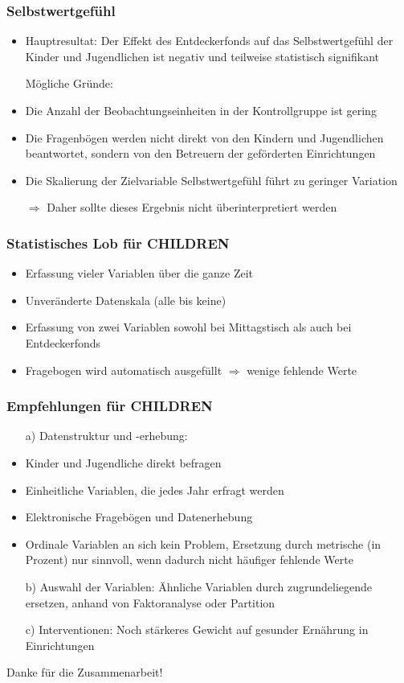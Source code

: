 \begin{frame}[fragile]
\frametitle{Selbstwertgefühl}
\begin{itemize}
\item Hauptresultat: Der Effekt des Entdeckerfonds auf das Selbstwertgefühl der Kinder und Jugendlichen ist negativ und teilweise statistisch signifikant
\linebreak
\item [ ] Mögliche Gründe:
\item Die Anzahl der Beobachtungseinheiten in der Kontrollgruppe ist gering
\item Die Fragenbögen werden nicht direkt von den Kindern und Jugendlichen beantwortet, sondern von den Betreuern der geförderten Einrichtungen
\item Die Skalierung der Zielvariable \glqq Selbstwertgefühl\grqq{} führt zu geringer Variation
\item [$\Rightarrow$] Daher sollte dieses Ergebnis nicht überinterpretiert werden
\end{itemize}
\end{frame}

\begin{frame}
\frametitle{Statistisches Lob für CHILDREN}
\begin{itemize}
\item<1-> Erfassung vieler Variablen über die ganze Zeit
\item<2-> Unveränderte Datenskala (alle bis keine)
\item<3-> Erfassung von zwei Variablen sowohl bei Mittagstisch als auch bei Entdeckerfonds
\item<4-> Fragebogen wird automatisch ausgefüllt $\Rightarrow$ wenige fehlende Werte
\end{itemize}
\end{frame}

\begin{frame}[fragile]
\frametitle{Empfehlungen für CHILDREN}
\begin{itemize}
\item[a)] Datenstruktur und -erhebung:
\item Kinder und Jugendliche direkt befragen
\item Einheitliche Variablen, die jedes Jahr erfragt werden
\item Elektronische Fragebögen und Datenerhebung
\item Ordinale Variablen an sich kein Problem, Ersetzung durch metrische (in Prozent) nur sinnvoll, wenn dadurch nicht häufiger fehlende Werte
\item[b)] Auswahl der Variablen: Ähnliche Variablen durch zugrundeliegende ersetzen, anhand von Faktoranalyse oder Partition 
\item[c)] Interventionen: Noch stärkeres Gewicht auf gesunder Ernährung in Einrichtungen
\end{itemize}
\end{frame}


\begin{frame}

Danke für die Zusammenarbeit!

\end{frame}
	



